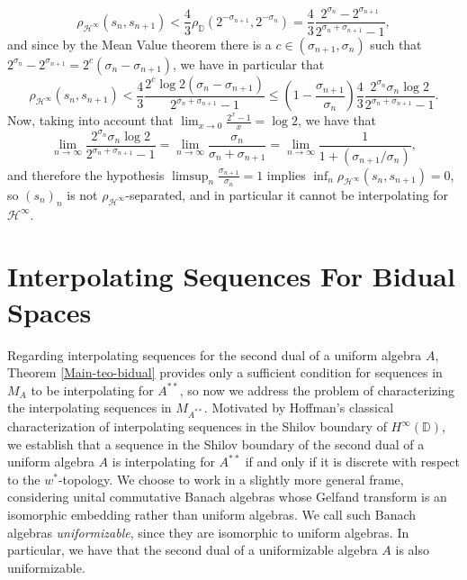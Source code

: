 \documentclass[preprint,12pt,number]{elsarticle}
\newcommand{\D}{\mathbb{D}}
\begin{document}
\[
\rho_{\mathscr{H}^{\infty}}(s_n,s_{n+1})<\frac{4}{3}\rho_\D(2^{-\sigma_{n+1}},2^{-\sigma_n})=\frac{4}{3}\frac{2^{\sigma_n}-2^{\sigma_{n+1}}}{2^{\sigma_n+\sigma_{n+1}}-1},
\] 
and since by the Mean Value theorem there is a $c\in(\sigma_{n+1},\sigma_{n})$ such that $2^{\sigma_n}-2^{\sigma_{n+1}}=2^c(\sigma_{n}-\sigma_{n+1})$,  we have in particular that 
\[
\rho_{\mathscr{H}^{\infty}}(s_n,s_{n+1})<\frac{4}{3}\frac{2^c\log2(\sigma_{n}-\sigma_{n+1})}{2^{\sigma_n+\sigma_{n+1}}-1}\leq \left(1-\frac{\sigma_{n+1}}{\sigma_n}\right)\frac{4}{3}\frac{2^{\sigma_n}\sigma_n\log2}{2^{\sigma_n+\sigma_{n+1}}-1}.
\] 
Now, taking into account that $\lim_{x\to 0}\frac{2^x-1}{x}=\log2$, we have that 
\[
\lim_{n\to\infty}\frac{2^{\sigma_n}\sigma_n\log2}{2^{\sigma_n+\sigma_{n+1}}-1}=\lim_{n\to\infty}\frac{\sigma_n}{\sigma_n+\sigma_{n+1}}=\lim_{n\to\infty}\frac{1}{1+(\sigma_{n+1}/\sigma_n)},
\] 
and therefore the hypothesis $\limsup_n\frac{\sigma_{n+1}}{\sigma_n}=1$ implies  $\inf_{n}\rho_{\mathscr{H}^{\infty}}(s_n,s_{n+1})=0$, so $(s_n)_n$ is not $\rho_{\mathscr{H}^{\infty}}$-separated, and in particular it cannot be interpolating for $\mathscr{H}^{\infty}$.

\section{Interpolating Sequences For Bidual Spaces}\label{Section-5}
\vspace{0.3cm}
Regarding interpolating sequences for the second dual of a uniform algebra $A$, Theorem \ref{Main-teo-bidual} provides only a sufficient condition for sequences in $M_A$ to be interpolating for $A^{**}$, so now we address the problem of characterizing the interpolating sequences in $M_{A^{**}}$. Motivated by Hoffman's classical characterization of interpolating sequences in the Shilov boundary of $H^\infty(\mathbb{D})$, we establish that a sequence in the Shilov boundary of the second dual of a uniform algebra $A$ is interpolating for $A^{**}$ if and only if it is discrete with respect to the $w^*$-topology.
We choose to work in a slightly more general frame, considering unital commutative Banach algebras whose Gelfand transform is an isomorphic embedding rather than uniform algebras. We call such Banach algebras \emph{uniformizable}, since they are isomorphic to uniform algebras. In particular, we have that the second dual of a uniformizable algebra $A$ is also uniformizable. 
\end{document}
